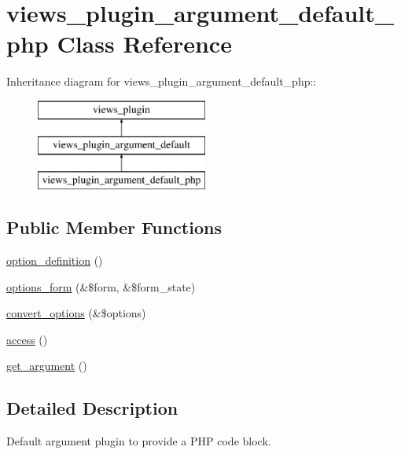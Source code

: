 \hypertarget{classviews__plugin__argument__default__php}{
\section{views\_\-plugin\_\-argument\_\-default\_\-php Class Reference}
\label{classviews__plugin__argument__default__php}
}
Inheritance diagram for views\_\-plugin\_\-argument\_\-default\_\-php::\begin{figure}[H]
\begin{center}
\leavevmode
\includegraphics[height=3cm]{classviews__plugin__argument__default__php}
\end{center}
\end{figure}
\subsection*{Public Member Functions}
\begin{DoxyCompactItemize}
\item 
\hyperlink{classviews__plugin__argument__default__php_ab5a278f9c6318deee971fd12ef18b604}{option\_\-definition} ()
\item 
\hyperlink{classviews__plugin__argument__default__php_adfe529cfc20d02c8e2de13451dfa7071}{options\_\-form} (\&\$form, \&\$form\_\-state)
\item 
\hyperlink{classviews__plugin__argument__default__php_ab95fe7eaef0011eef60a382224095ede}{convert\_\-options} (\&\$options)
\item 
\hyperlink{classviews__plugin__argument__default__php_aff864fbd2dcbea7ecd3589429bbf3a2a}{access} ()
\item 
\hyperlink{classviews__plugin__argument__default__php_a2f714a25b2da5a135daa28adfab84eb9}{get\_\-argument} ()
\end{DoxyCompactItemize}


\subsection{Detailed Description}
Default argument plugin to provide a PHP code block. 

